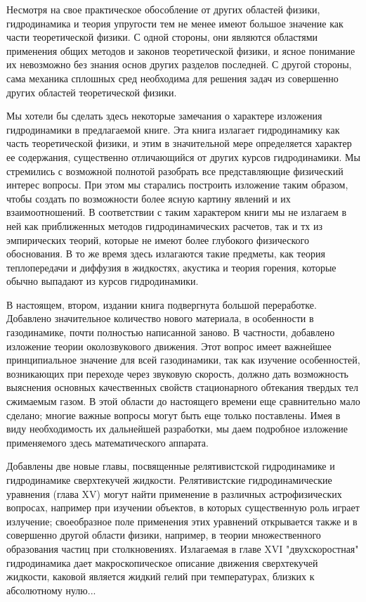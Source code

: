 Несмотря на свое практическое обособление от других областей физики,
гидродинамика и теория упругости тем не менее имеют большое значение как части
теоретической физики. С одной стороны, они являются областями применения общих
методов и законов теоретической физики, и ясное понимание их невозможно без
знания основ других разделов последней. С другой стороны, сама механика сплошных
сред необходима для решения задач из совершенно других областей теоретической
физики.

Мы хотели бы сделать здесь некоторые замечания о характере изложения
гидродинамики в предлагаемой книге. Эта книга излагает гидродинамику как часть
теоретической физики, и этим в значительной мере определяется характер ее
содержания, существенно отличающийся от других курсов гидродинамики. Мы
стремились с возможной полнотой разобрать все представляющие физический интерес
вопросы. При этом мы старались построить изложение таким образом, чтобы создать
по возможности более ясную картину явлений и их взаимоотношений. В соответствии
с таким характером книги мы не излагаем в ней как приближенных методов
гидродинамических расчетов, так и тх из эмпирических теорий, которые не имеют
более глубокого физического обоснования. В то же время здесь излагаются такие
предметы, как теория теплопередачи и диффузия в жидкостях, акустика и теория
горения, которые обычно выпадают из курсов гидродинамики.

В настоящем, втором, издании книга подвергнута большой переработке. Добавлено
значительное количество нового материала, в особенности в газодинамике, почти
полностью написанной заново. В частности, добавлено изложение теории
околозвукового движения. Этот вопрос имеет важнейшее принципиальное значение для
всей газодинамики, так как изучение особенностей, возникающих при переходе через
звуковую скорость, должно дать возможность выяснения основных качественных
свойств стационарного обтекания твердых тел сжимаемым газом. В этой области до
настоящего времени еще сравнительно мало сделано; многие важные вопросы могут
быть еще только поставлены. Имея в виду необходимость их дальнейшей разработки,
мы даем подробное изложение применяемого здесь математического аппарата.

Добавлены две новые главы, посвященные релятивистской гидродинамике и
гидродинамике сверхтекучей жидкости. Релятивистские гидродинамические уравнения
(глава XV) могут найти применение в различных астрофизических вопросах, например
при изучении объектов, в которых существенную роль играет излучение;
своеобразное поле применения этих уравнений открывается также и в совершенно
другой области физики, например, в теории множественного образования частиц при
столкновениях. Излагаемая в главе XVI "двухскоростная" гидродинамика дает
макроскопическое описание движения сверхтекучей жидкости, каковой является
жидкий гелий при температурах, близких к абсолютному нулю...

